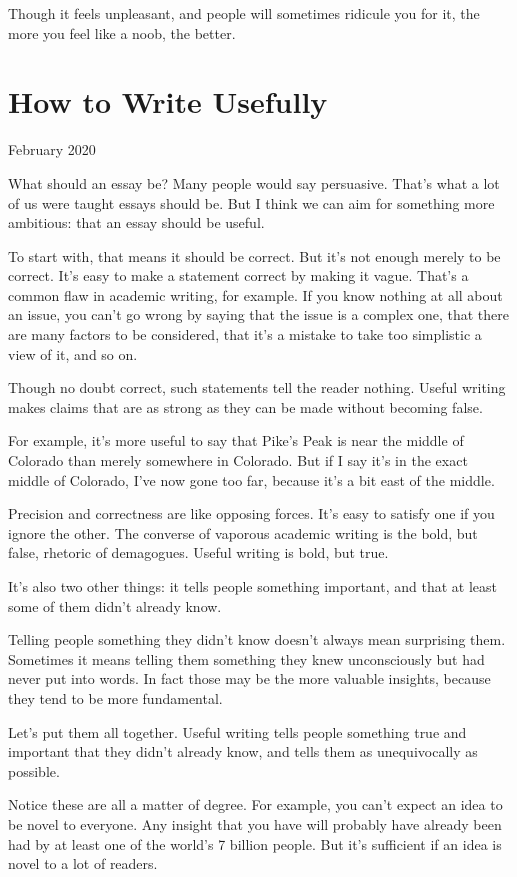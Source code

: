 \documentclass[12pt]{book}
\begin{document}
Though it feels unpleasant, and people will sometimes ridicule you for
it, the more you feel like a noob, the better.
\chapter{How to Write Usefully}

February 2020

What should an essay be? Many people would say persuasive. That's what a
lot of us were taught essays should be. But I think we can aim for
something more ambitious: that an essay should be useful.

To start with, that means it should be correct. But it's not enough
merely to be correct. It's easy to make a statement correct by making it
vague. That's a common flaw in academic writing, for example. If you
know nothing at all about an issue, you can't go wrong by saying that
the issue is a complex one, that there are many factors to be
considered, that it's a mistake to take too simplistic a view of it, and
so on.

Though no doubt correct, such statements tell the reader nothing. Useful
writing makes claims that are as strong as they can be made without
becoming false.

For example, it's more useful to say that Pike's Peak is near the middle
of Colorado than merely somewhere in Colorado. But if I say it's in the
exact middle of Colorado, I've now gone too far, because it's a bit east
of the middle.

Precision and correctness are like opposing forces. It's easy to satisfy
one if you ignore the other. The converse of vaporous academic writing
is the bold, but false, rhetoric of demagogues. Useful writing is bold,
but true.

It's also two other things: it tells people something important, and
that at least some of them didn't already know.

Telling people something they didn't know doesn't always mean surprising
them. Sometimes it means telling them something they knew unconsciously
but had never put into words. In fact those may be the more valuable
insights, because they tend to be more fundamental.

Let's put them all together. Useful writing tells people something true
and important that they didn't already know, and tells them as
unequivocally as possible.

Notice these are all a matter of degree. For example, you can't expect
an idea to be novel to everyone. Any insight that you have will probably
have already been had by at least one of the world's 7 billion people.
But it's sufficient if an idea is novel to a lot of readers.
\end{document}
